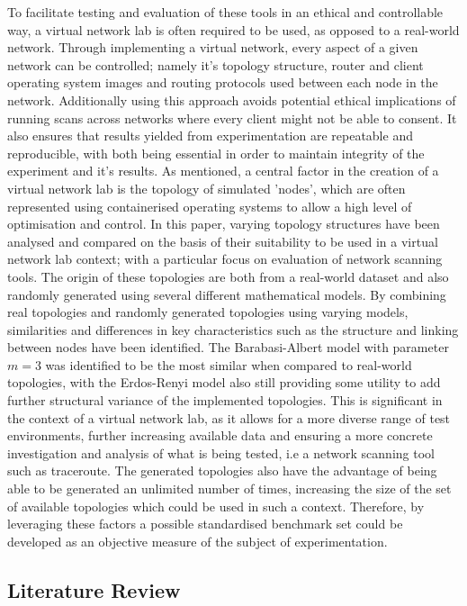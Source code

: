 To facilitate testing and evaluation of these tools in an ethical and controllable way, a virtual network lab is often required to be used, as opposed to a real-world network. Through implementing a virtual network, every aspect of a given network can be controlled; namely it's topology structure, router and client operating system images and routing protocols used between each node in the network. Additionally using this approach avoids potential ethical implications of running scans across networks where every client might not be able to consent. It also ensures that results yielded from experimentation are repeatable and reproducible, with both being essential in order to maintain integrity of the experiment and it's results. As mentioned, a central factor in the creation of a virtual network lab is the topology of simulated 'nodes', which are often represented using containerised operating systems to allow a high level of optimisation and control. In this paper, varying topology structures have been analysed and compared on the basis of their suitability to be used in a virtual network lab context; with a particular focus on evaluation of network scanning tools. The origin of these topologies are both from a real-world dataset and also randomly generated using several different mathematical models. By combining real topologies and randomly generated topologies using varying models, similarities and differences in key characteristics such as the structure and linking between nodes have been identified. The Barabasi-Albert model with parameter $m=3$ was identified to be the most similar when compared to real-world topologies, with the Erdos-Renyi model also still providing some utility to add further structural variance of the implemented topologies. This is significant in the context of a virtual network lab, as it allows for a more diverse range of test environments, further increasing available data and ensuring a more concrete investigation and analysis of what is being tested, i.e a network scanning tool such as traceroute. The generated topologies also have the advantage of being able to be generated an unlimited number of times, increasing the size of the set of available topologies which could be used in such a context. Therefore, by leveraging these factors a possible standardised benchmark set could be developed as an objective measure of the subject of experimentation. 



\subsection{Literature Review}

